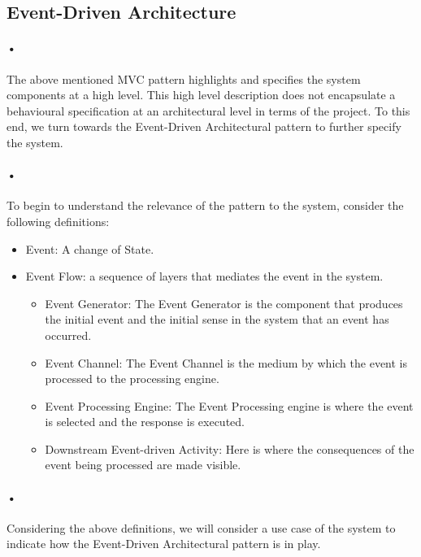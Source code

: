 \documentclass[11pt]{article}
\begin{document}
\pagebreak


\subsection{Event-Driven Architecture}
\paragraph{•}
The above mentioned MVC pattern highlights and specifies the system components at a high level. This high level description does not encapsulate a behavioural specification at an architectural level in terms of the project. To this end, we turn towards the Event-Driven Architectural pattern to further specify the system.

\paragraph{•}
To begin to understand the relevance of the pattern to the system, consider the following definitions:

\begin{itemize}
\item Event: A change of State.
\item Event Flow: a sequence of layers that mediates the event in the system.
	\begin{itemize}
	\item Event Generator: The Event Generator is the component that produces the initial event and the initial sense in the system that an event has occurred.
	\item Event Channel: The Event Channel is the medium by which the event is processed to the processing engine.
	\item Event Processing Engine: The Event Processing engine is where the event is selected and the response is executed. 
	\item Downstream Event-driven Activity: Here is where the consequences of the event being processed are made visible.
	\end{itemize}
\end{itemize}

\paragraph{•}
Considering the above definitions, we will consider a use case of the system to indicate how the Event-Driven Architectural pattern is in play.
\end{document}
